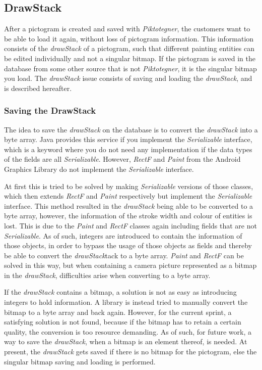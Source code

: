 \subsection{DrawStack}
After a pictogram is created and saved with \textit{Piktotegner}, the customers want to be able to load it again, without loss of pictogram information.
This information consists of the \textit{drawStack} of a pictogram, such that different painting entities can be edited individually and not a singular bitmap.
If the pictogram is saved in the database from some other source that is not \textit{Piktotegner}, it is the singular bitmap you load.
The \textit{drawStack} issue consists of saving and loading the \textit{drawStack}, and is described hereafter.

\subsubsection*{Saving the DrawStack}
The idea to save the \textit{drawStack} on the database is to convert the \textit{drawStack} into a byte array.
Java provides this service if you implement the \textit{Serializable} interface, which is a keyword where you do not need any implementation if the data types of the fields are all \textit{Serializable}.
However, \textit{RectF} and \textit{Paint} from the Android Graphics Library do not implement the \textit{Serializable} interface.

At first this is tried to be solved by making \textit{Serializable} versions of those classes, which then extends \textit{RectF} and \textit{Paint} respectively but implement the \textit{Serializable} interface.
This method resulted in the \textit{drawStack} being able to be converted to a byte array, however, the information of the stroke width and colour of entities is lost.
This is due to the \textit{Paint} and \textit{RectF} classes again including fields that are not \textit{Serializable}.
As of such, integers are introduced to contain the information of those objects, in order to bypass the usage of those objects as fields and thereby be able to convert the \textit{drawStack}tack to a byte array.
\textit{Paint} and \textit{RectF} can be solved in this way, but when containing a camera picture represented as a bitmap in the \textit{drawStack}, difficulties arise when converting to a byte array.

If the \textit{drawStack} contains a bitmap, a solution is not as easy as introducing integers to hold information.
A library is instead tried to manually convert the bitmap to a byte array and back again.
However, for the current sprint, a satisfying solution is not found, because if the bitmap has to retain a certain quality, the conversion is too resource demanding.
As of such, for future work, a way to save the \textit{drawStack}, when a bitmap is an element thereof, is needed.
At present, the \textit{drawStack} gets saved if there is no bitmap for the pictogram, else the singular bitmap saving and loading is performed.

